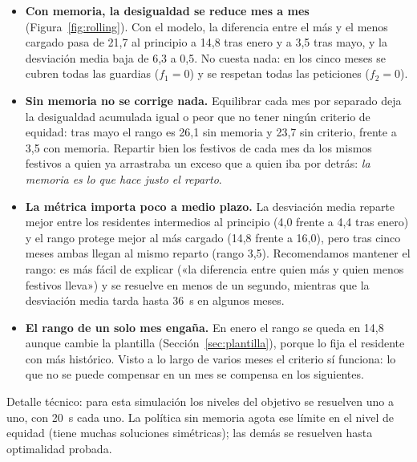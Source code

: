 \begin{itemize}
  \item \textbf{Con memoria, la desigualdad se reduce mes a mes} (Figura~\ref{fig:rolling}). Con el modelo, la diferencia entre el más y el menos cargado pasa de 21,7 al principio a 14,8 tras enero y a 3,5 tras mayo, y la desviación media baja de 6,3 a 0,5. No cuesta nada: en los cinco meses se cubren todas las guardias ($f_1 = 0$) y se respetan todas las peticiones ($f_2 = 0$).
  \item \textbf{Sin memoria no se corrige nada.} Equilibrar cada mes por separado deja la desigualdad acumulada igual o peor que no tener ningún criterio de equidad: tras mayo el rango es 26,1 sin memoria y 23,7 sin criterio, frente a 3,5 con memoria. Repartir bien los festivos de cada mes da los mismos festivos a quien ya arrastraba un exceso que a quien iba por detrás: \emph{la memoria es lo que hace justo el reparto}.
  \item \textbf{La métrica importa poco a medio plazo.} La desviación media reparte mejor entre los residentes intermedios al principio (4,0 frente a 4,4 tras enero) y el rango protege mejor al más cargado (14,8 frente a 16,0), pero tras cinco meses ambas llegan al mismo reparto (rango 3,5). Recomendamos mantener el rango: es más fácil de explicar («la diferencia entre quien más y quien menos festivos lleva») y se resuelve en menos de un segundo, mientras que la desviación media tarda hasta 36~s en algunos meses.
  \item \textbf{El rango de un solo mes engaña.} En enero el rango se queda en 14,8 aunque cambie la plantilla (Sección~\ref{sec:plantilla}), porque lo fija el residente con más histórico. Visto a lo largo de varios meses el criterio sí funciona: lo que no se puede compensar en un mes se compensa en los siguientes.
\end{itemize}

{\small Detalle técnico: para esta simulación los niveles del objetivo se resuelven uno a uno, con 20~s cada uno. La política sin memoria agota ese límite en el nivel de equidad (tiene muchas soluciones simétricas); las demás se resuelven hasta optimalidad probada.\par}
